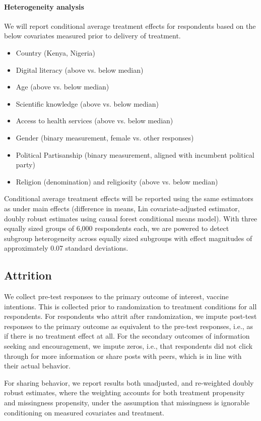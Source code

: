 \documentclass[letterpaper, 12pt, parskip=full,DIV=10]{scrartcl}
\begin{document}
\paragraph{Heterogeneity analysis}
We will report conditional average treatment effects for respondents based on the below covariates measured prior to delivery of treatment. 
\begin{itemize}
\item Country (Kenya, Nigeria)
\item Digital literacy (above vs. below median)
\item Age (above vs. below median)
\item Scientific knowledge (above vs. below median)
\item Access to health services (above vs. below median)
\item Gender (binary measurement, female vs. other responses)
\item Political Partisanship (binary measurement, aligned with incumbent political party)
\item Religion (denomination) and religiosity (above vs. below median)
\end{itemize}

Conditional average treatment effects will be reported using the same estimators as under main effects (difference in means, Lin covariate-adjusted estimator, doubly robust estimates using causal forest conditional means model). With three equally sized groups of 6,000 respondents each, we are powered to detect subgroup heterogeneity across equally sized subgroups with effect magnitudes of approximately 0.07 standard deviations. 

\subsection{Attrition}
We collect pre-test responses to the primary outcome of interest, vaccine intentions. This is collected prior to randomization to treatment conditions for all respondents. For respondents who attrit after randomization, we impute post-test responses to the primary outcome as equivalent to the pre-test responses, i.e., as if there is no treatment effect at all. For the secondary outcomes of information seeking and encouragement, we impute zeros, i.e., that respondents did not click through for more information or share posts with peers, which is in line with their actual behavior. 

For sharing behavior, we report results both unadjusted, and re-weighted doubly robust estimates, where the weighting accounts for both treatment propensity and missingness propensity, under the assumption that missingness is ignorable conditioning on measured covariates and treatment. 
\end{document}
